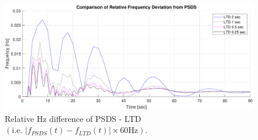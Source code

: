\documentclass[12pt]{article}
\begin{document}
	\begin{figure}[h!]
			\centering
			\includegraphics[width=\linewidth]{tsCompRelF}\vspace{-1em}
			\caption{Relative Hz difference of PSDS - LTD $\left( \text{i.e. }  \left|f_{PSDS}(t)- f_{LTD}(t)\right| \times 60 \text{Hz} \right)$.}
			\label{tsComprelF}		 
	\end{figure}\vspace{-.5em}
\end{document}
